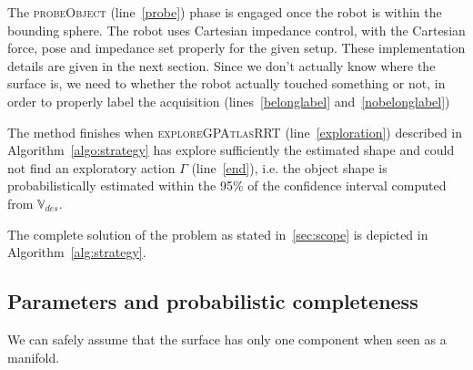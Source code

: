 The \textsc{probeObject} (line~\ref{probe}) phase is engaged once the robot is within the bounding sphere. The robot uses Cartesian impedance control, with the Cartesian force, pose and impedance set properly for the given setup. These implementation details are given in the next section. Since we don't actually know where the surface is, we need to whether the robot actually touched something or not, in order to properly label the acquisition (lines~\ref{belonglabel} and~\ref{nobelonglabel}) 

The method finishes when \textsc{exploreGPAtlasRRT} (line~\ref{exploration}) described in Algorithm~\ref{algo:strategy} has explore sufficiently the estimated shape and could not find an exploratory action $\Gamma$ (line~\ref{end}), i.e. the object shape is probabilistically estimated within the 95\% of the confidence interval computed from $\mathbb{V}_{des}$. 

The complete solution of the problem as stated in~\ref{sec:scope} is depicted in Algorithm~\ref{alg:strategy}.

\subsection{Parameters  and probabilistic completeness}
\label{sec:analsys}

We can safely assume that the surface has only one component when seen as a manifold.

